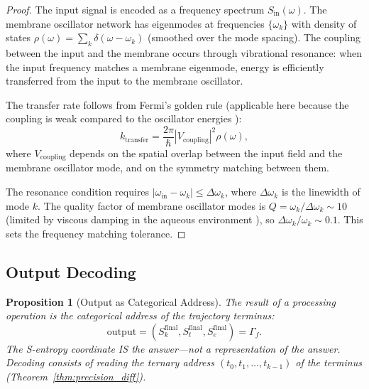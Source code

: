 \documentclass[twocolumn,10pt]{article}
\newtheorem{proposition}[theorem]{Proposition}
\theoremstyle{remark}
\newcommand{\Sk}{S_k}
\newcommand{\St}{S_t}
\newcommand{\Se}{S_e}
\begin{document}
\begin{proof}
The input signal is encoded as a frequency spectrum $S_{\mathrm{in}}(\omega)$. The membrane oscillator network has eigenmodes at frequencies $\{\omega_k\}$ with density of states $\rho(\omega) = \sum_k \delta(\omega - \omega_k)$ (smoothed over the mode spacing). The coupling between the input and the membrane occurs through vibrational resonance: when the input frequency matches a membrane eigenmode, energy is efficiently transferred from the input to the membrane oscillator.

The transfer rate follows from Fermi's golden rule (applicable here because the coupling is weak compared to the oscillator energies \cite{kramers1940}):
\begin{equation}
k_{\mathrm{transfer}} = \frac{2\pi}{\hbar} |V_{\mathrm{coupling}}|^2 \rho(\omega),
\end{equation}
where $V_{\mathrm{coupling}}$ depends on the spatial overlap between the input field and the membrane oscillator mode, and on the symmetry matching between them.

The resonance condition requires $|\omega_{\mathrm{in}} - \omega_k| \leq \Delta\omega_k$, where $\Delta\omega_k$ is the linewidth of mode $k$. The quality factor of membrane oscillator modes is $Q = \omega_k / \Delta\omega_k \sim 10$ (limited by viscous damping in the aqueous environment \cite{lipowsky1995}), so $\Delta\omega_k / \omega_k \sim 0.1$. This sets the frequency matching tolerance.
\end{proof}

\subsection{Output Decoding}

\begin{proposition}[Output as Categorical Address]
\label{prop:output}
The result of a processing operation is the categorical address of the trajectory terminus:
\begin{equation}
\mathrm{output} = (\Sk^{\mathrm{final}}, \St^{\mathrm{final}}, \Se^{\mathrm{final}}) = \Gamma_f.
\label{eq:output}
\end{equation}
The S-entropy coordinate IS the answer---not a representation of the answer. Decoding consists of reading the ternary address $(t_0, t_1, \ldots, t_{k-1})$ of the terminus (Theorem~\ref{thm:precision_diff}).
\end{proposition}
\end{document}
